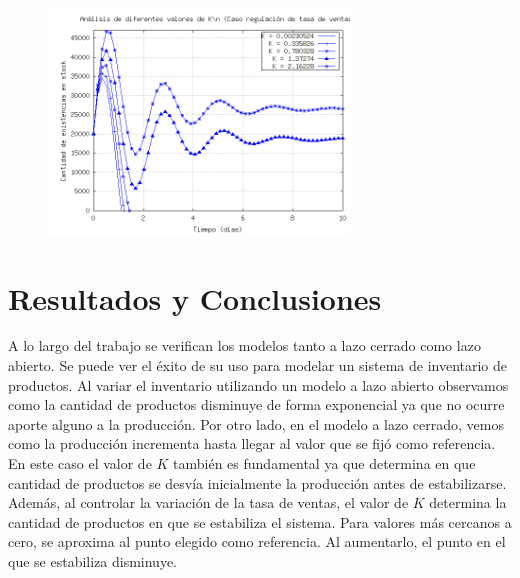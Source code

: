 \documentclass{sig-alternate}
\begin{document}
\begin{figure}[h]
\begin{center}
\includegraphics[width=8cm]{../src/k_plot2.png}
\caption{\label{fig:lazo_cerrado_var_tventas} }
\end{center}
\end{figure}

\section{Resultados y Conclusiones}
\label{results_and_conclusions_section}
A lo largo del trabajo se verifican los modelos tanto a lazo cerrado como lazo abierto. Se puede ver el éxito de su uso para modelar un sistema
de inventario de productos. Al variar el inventario utilizando un modelo a lazo abierto observamos como la cantidad de productos disminuye de
forma exponencial ya que no ocurre aporte alguno a la producción.  Por otro lado, en el modelo a lazo cerrado, vemos como la producción 
incrementa hasta llegar al valor que se fijó como referencia. En este caso el valor de $K$ también es fundamental ya que determina
en que cantidad de productos se desvía inicialmente la producción antes de estabilizarse. Además, al controlar la variación de la tasa de ventas,
el valor de $K$ determina la cantidad de productos en que se estabiliza el sistema. Para valores más cercanos a cero, se aproxima al punto
elegido como referencia. Al aumentarlo, el punto en el que se estabiliza disminuye.


\nocite{*}

\end{document}
